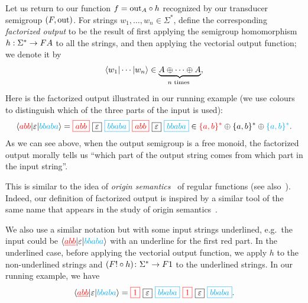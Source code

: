 Let us return to our function $f = \mathrm{out}_A \circ h$ recognized by our transducer semigroup $(\functor,\outfun)$.
For strings $w_1,\ldots,w_n \in \Sigma^*$, define the corresponding \emph{factorized output} to be the result of first applying the semigroup homomorphism $h : \Sigma^* \to \functor A$ to all the strings, and then applying the vectorial output function; we denote it by 
\begin{align*}
\tuple{w_1| \cdots | w_n} \in \myunderbrace{A \oplus \cdots \oplus A}{$n$ times},
\end{align*}
Here is the factorized output illustrated in our running example (we use colours to distinguish which of the three parts of the input is used):
\begin{align*}
        \tuple{\red{abb} | \varepsilon | \blue{bbaba}} =  
        \red{\boxed{abb}} \ 
        \boxed{\varepsilon} \ 
        \blue{\boxed{bbaba}} \ 
        \red{\boxed{abb}} \ 
        \boxed{\varepsilon} \
        \blue{\boxed{bbaba}} \in \red{\set{a,b}^*} \oplus \set{a,b}^*  \oplus \blue{\set{a,b}^*}.
\end{align*}
As we can see above, when the output semigroup is a free monoid, the factorized output morally tells us \enquote{which part of the output string comes from which part in the input string}.
\begin{remark}
This is similar to the idea of \emph{origin semantics}~\cite{bojanczykTransducersOriginInformation2014} of regular functions (see also~\cite[Section~5]{MuschollPuppis}). Indeed, our definition of factorized output is inspired by a similar tool of the same name that appears in the study of origin semantics~\cite[Section~2]{bojanczykTransducersOriginInformation2014}.
\end{remark}

We also use a similar notation but with some input strings underlined, e.g.~the input could be $\langle {\color{red}\underline{abb}} | \varepsilon | {\color{cyan}bbaba} \rangle$ with an underline for the first red part. In the underlined case, before applying the vectorial output function, we apply $h$ to the non-underlined strings and
$(\functor! \circ h) \colon \Sigma^* \to \functor1$
to the underlined strings. In our running example, we have
    \begin{align*}
        \tuple{\red{\underline{abb}} | \varepsilon | \blue{bbaba}} =  
        \red{\boxed{1}} \ 
        \boxed{\varepsilon} \
        \blue{\boxed{bbaba}} \ 
        \red{\boxed{1}} \ 
        \boxed{\varepsilon} \
        \blue{\boxed{bbaba}}.
        \end{align*}

